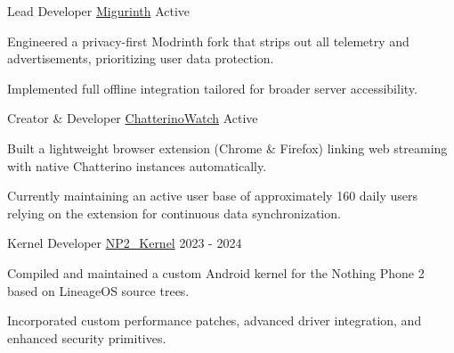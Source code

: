 \documentclass[11pt, a4paper]{awesome-cv}
\begin{document}
\begin{cventries}

  \cventry
    {Lead Developer} %
    {\href{https://migurinth.miguvt.com/}{Migurinth}} %
    {} %
    {Active} %
    {
      \begin{cvitems} %
        \item {Engineered a privacy-first Modrinth fork that strips out all telemetry and advertisements, prioritizing user data protection.}
        \item {Implemented full offline integration tailored for broader server accessibility.}
      \end{cvitems}
    }

  \cventry
    {Creator \& Developer} %
    {\href{https://github.com/MiguVT/ChatterinoWatch}{ChatterinoWatch}} %
    {} %
    {Active} %
    {
      \begin{cvitems} %
        \item {Built a lightweight browser extension (Chrome \& Firefox) linking web streaming with native Chatterino instances automatically.}
        \item {Currently maintaining an active user base of approximately 160 daily users relying on the extension for continuous data synchronization.}
      \end{cvitems}
    }

  \cventry
    {Kernel Developer} %
    {\href{https://github.com/MiguVT/NP2_Kernel}{NP2\_Kernel}} %
    {} %
    {2023 - 2024} %
    {
      \begin{cvitems} %
        \item {Compiled and maintained a custom Android kernel for the Nothing Phone 2 based on LineageOS source trees.}
        \item {Incorporated custom performance patches, advanced driver integration, and enhanced security primitives.}
      \end{cvitems}
    }

\end{cventries}
\end{document}
